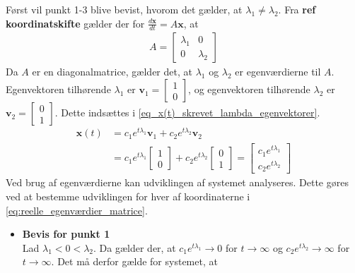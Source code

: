 \begin{bev} \textbf{} %
\newline
Først vil punkt 1-3 blive bevist, hvorom det gælder, at $\lambda_1 \neq \lambda_2$. Fra \textbf{ref koordinatskifte} gælder der for $\frac{d\textbf{x}}{dt} = A\textbf{x}$, at
    \begin{align*}A=
        \begin{bmatrix}
        \lambda_1 & 0 \\
        0 & \lambda_2
        \end{bmatrix}
    \end{align*}
    Da $A$ er en diagonalmatrice, gælder det, at $\lambda_1$ og $\lambda_2$ er egenværdierne til $A$. Egenvektoren tilhørende $\lambda_1$ er $\textbf{v}_1 = \begin{bmatrix} 1 \\0\end{bmatrix}$, og egenvektoren tilhørende $\lambda_2$ er $\textbf{v}_2 = \begin{bmatrix} 0 \\1\end{bmatrix}$. Dette indsættes i \eqref{eq_x(t)_skrevet_lambda_egenvektorer}.
    \begin{align}
    \textbf{x}(t) &= c_1e^{t\lambda_1}\textbf{v}_1 + c_2e^{t\lambda_2}\textbf{v}_2 \nonumber \\
    &= c_1e^{t\lambda_1}\begin{bmatrix} 1 \\0\end{bmatrix} + c_2e^{t\lambda_2}\begin{bmatrix} 0 \\1\end{bmatrix}= \begin{bmatrix} c_1e^{t\lambda_1} \\ c_2e^{t\lambda_2}\end{bmatrix}\label{eq:reelle_egenværdier_matrice}
    \end{align}
    Ved brug af egenværdierne kan udviklingen af systemet analyseres. Dette gøres ved at bestemme udviklingen for hver af koordinaterne i \eqref{eq:reelle_egenværdier_matrice}.
\begin{itemize}
    \item [] \textbf{Bevis for punkt 1} \\
    Lad $\lambda_1 < 0 < \lambda_2$. Da gælder der, at $c_1e^{t\lambda_1} \to 0$ for $t\to \infty$ og $c_2e^{t\lambda_2} \to \infty$ for $t \to \infty$. Det må derfor gælde for systemet, at 
    \begin{align*}

\end{align*}
\end{itemize}
\end{bev}
